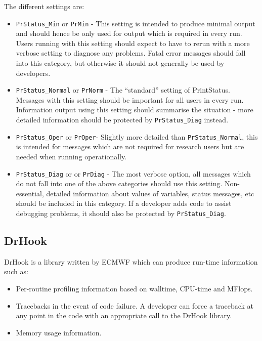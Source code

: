 The different settings are:
\begin{itemize}

\item \verb|PrStatus_Min| or \verb|PrMin| - This setting is intended to produce minimal output
and should hence be only used for output which is required in every run. Users
running with this setting should expect to have to rerun with a more verbose
setting to diagnose any problems. Fatal error messages should fall into this
category, but otherwise it should not generally be used by developers.

\item \verb|PrStatus_Normal| or \verb|PrNorm| - The ``standard'' setting of PrintStatus. Messages
with this setting should be important for all users in every run. Information
output using this setting should summarise the situation - more detailed
information should be protected by \verb|PrStatus_Diag| instead.

\item \verb|PrStatus_Oper| or \verb|PrOper|- Slightly more detailed than \verb|PrStatus_Normal|,
this is intended for messages which are not required for research users but are
needed when running operationally.

\item \verb|PrStatus_Diag| or or \verb|PrDiag| - The most verbose option, all messages which do not
fall into one of the above categories should use this setting. Non-essential,
detailed information about values of  variables, status messages, etc should be
included in this category. If a developer adds code to assist debugging
problems, it should also be protected by \verb|PrStatus_Diag|.

\end{itemize}

\subsection{DrHook}\label{sec:drhook}

DrHook is a library written by ECMWF which can produce run-time information such as:

\begin{itemize}
  \item Per-routine profiling information based on walltime, CPU-time and MFlops.
  \item Tracebacks in the event of code failure. A developer can force a traceback at any point in the
        code with an appropriate call to the DrHook library.
  \item Memory usage information.
\end{itemize}

